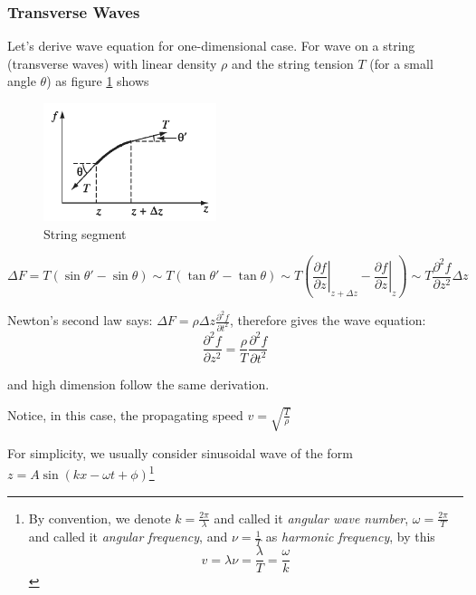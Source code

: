 \documentclass[openany]{book}
\begin{document}
\subsubsection{Transverse Waves}
Let's derive wave equation for one-dimensional case. For wave on a string (transverse waves) with linear density $\rho $ and the string tension $T$ (for a small angle $\theta $) as figure \ref{fig2} shows
\begin{figure}[H]
\centering
\includegraphics[width=0.45\textwidth]{Figure/2.PNG}
\caption{String segment}
\label{fig2}
\end{figure}
\[\Delta F=T(\sin \theta '-\sin \theta )\sim T(\tan \theta '-\tan \theta )\sim T\left(\left.\frac{\partial f}{\partial z}\right|_{z+\Delta z}-\left.\frac{\partial f}{\partial z}\right|_{z}\right)\sim T\frac{\partial ^2f}{\partial z^2}\Delta z\]

Newton's second law says: $\Delta F=\rho \Delta z\frac{\partial ^2f}{\partial t^2}$, therefore gives the wave equation: 
\begin{equation}
\frac{\partial ^2f}{\partial z^2}=\frac{\rho }{T}\frac{\partial ^2f}{\partial t^2}
\end{equation}

and high dimension follow the same derivation. 

Notice, in this case, the propagating speed $v=\sqrt{\frac{T}{\rho }}$

For simplicity, we usually consider sinusoidal wave of the form $z=A\sin (kx-\omega t+\phi )$\footnote{By convention, we denote $k=\frac{2\pi }{\lambda }$ and called it \emph{angular wave number}, $\omega =\frac{2\pi }{T}$ and called it \emph{angular frequency}, and $\nu =\frac{1}{T}$ as \emph{harmonic frequency}, by this
\[v=\lambda \nu=\frac{\lambda }{T}=\frac{\omega }{k}\]}
\end{document}
